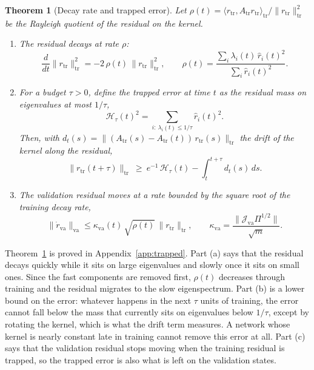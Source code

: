 \documentclass[11pt]{article}
\newtheorem{theorem}{Theorem}
\theoremstyle{definition}
\theoremstyle{remark}
\newcommand{\Hard}{\mathcal{H}}
\newcommand{\tr}{\mathrm{tr}}
\newcommand{\va}{\mathrm{va}}
\newcommand{\Jac}{\mathcal{J}}
\begin{document}
\begin{theorem}[Decay rate and trapped error]\label{thm:trapped}
Let $\rho(t) = \langle r_\tr, A_\tr r_\tr\rangle_\tr/\|r_\tr\|_\tr^2$ be the Rayleigh quotient of the residual on the kernel.
\begin{enumerate}[label=(\alph*)]
\item The residual decays at rate $\rho$:
\begin{equation}\label{eq:rate}
\frac{d}{dt}\|r_\tr\|_\tr^2 = -2\,\rho(t)\,\|r_\tr\|_\tr^2, \qquad \rho(t) = \frac{\sum_i \lambda_i(t)\,\hat r_i(t)^2}{\sum_i \hat r_i(t)^2} .
\end{equation}
\item For a budget $\tau > 0$, define the trapped error at time $t$ as the residual mass on eigenvalues at most $1/\tau$,
\begin{equation}\label{eq:trapped}
\Hard_\tau(t)^2 = \sum_{i:\ \lambda_i(t) \le 1/\tau}\hat r_i(t)^2 .
\end{equation}
Then, with $d_t(s) = \|(A_\tr(s) - A_\tr(t))\,r_\tr(s)\|_\tr$ the drift of the kernel along the residual,
\begin{equation}\label{eq:lower}
\|r_\tr(t+\tau)\|_\tr \ \ge\ e^{-1}\,\Hard_\tau(t) - \int_t^{t+\tau} d_t(s)\,ds .
\end{equation}
\item The validation residual moves at a rate bounded by the square root of the training decay rate,
\begin{equation}\label{eq:val-rate}
\|\dot r_\va\|_\va \le \kappa_\va(t)\,\sqrt{\rho(t)}\,\|r_\tr\|_\tr, \qquad \kappa_\va = \frac{\|\Jac_\va\Pi^{1/2}\|}{\sqrt m} .
\end{equation}
\end{enumerate}
\end{theorem}

Theorem~\ref{thm:trapped} is proved in Appendix~\ref{app:trapped}.
Part (a) says that the residual decays quickly while it sits on large eigenvalues and slowly once it sits on small ones.
Since the fast components are removed first, $\rho(t)$ decreases through training and the residual migrates to the slow eigenspectrum.
Part (b) is a lower bound on the error: whatever happens in the next $\tau$ units of training, the error cannot fall below the mass that currently sits on eigenvalues below $1/\tau$, except by rotating the kernel, which is what the drift term measures.
A network whose kernel is nearly constant late in training cannot remove this error at all.
Part (c) says that the validation residual stops moving when the training residual is trapped, so the trapped error is also what is left on the validation states.
\end{document}
